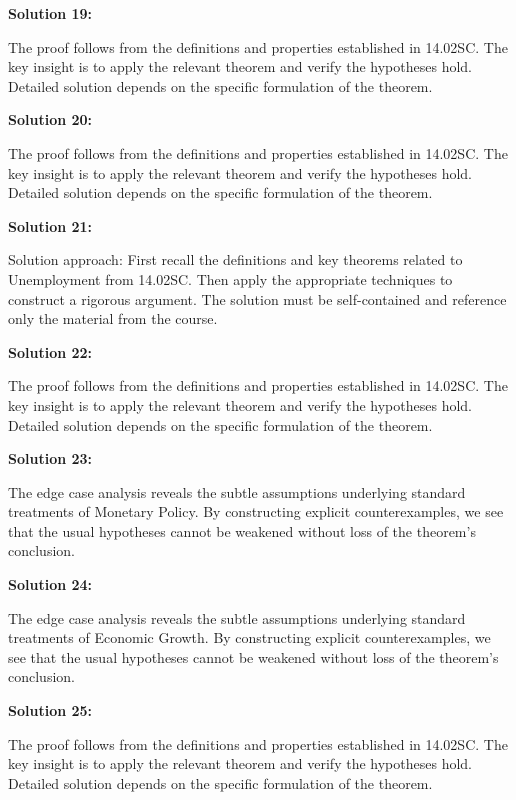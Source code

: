 \documentclass[12pt,a4paper]{exam}
\begin{document}
\vspace{0.5cm}

\textbf{Solution 19:}

The proof follows from the definitions and properties established in 14.02SC. The key insight is to apply the relevant theorem and verify the hypotheses hold. Detailed solution depends on the specific formulation of the theorem.

\vspace{0.5cm}

\textbf{Solution 20:}

The proof follows from the definitions and properties established in 14.02SC. The key insight is to apply the relevant theorem and verify the hypotheses hold. Detailed solution depends on the specific formulation of the theorem.

\vspace{0.5cm}

\textbf{Solution 21:}

Solution approach: First recall the definitions and key theorems related to Unemployment from 14.02SC. Then apply the appropriate techniques to construct a rigorous argument. The solution must be self-contained and reference only the material from the course.

\vspace{0.5cm}

\textbf{Solution 22:}

The proof follows from the definitions and properties established in 14.02SC. The key insight is to apply the relevant theorem and verify the hypotheses hold. Detailed solution depends on the specific formulation of the theorem.

\vspace{0.5cm}

\textbf{Solution 23:}

The edge case analysis reveals the subtle assumptions underlying standard treatments of Monetary Policy. By constructing explicit counterexamples, we see that the usual hypotheses cannot be weakened without loss of the theorem's conclusion.

\vspace{0.5cm}

\textbf{Solution 24:}

The edge case analysis reveals the subtle assumptions underlying standard treatments of Economic Growth. By constructing explicit counterexamples, we see that the usual hypotheses cannot be weakened without loss of the theorem's conclusion.

\vspace{0.5cm}

\textbf{Solution 25:}

The proof follows from the definitions and properties established in 14.02SC. The key insight is to apply the relevant theorem and verify the hypotheses hold. Detailed solution depends on the specific formulation of the theorem.

\vspace{0.5cm}
\end{document}
